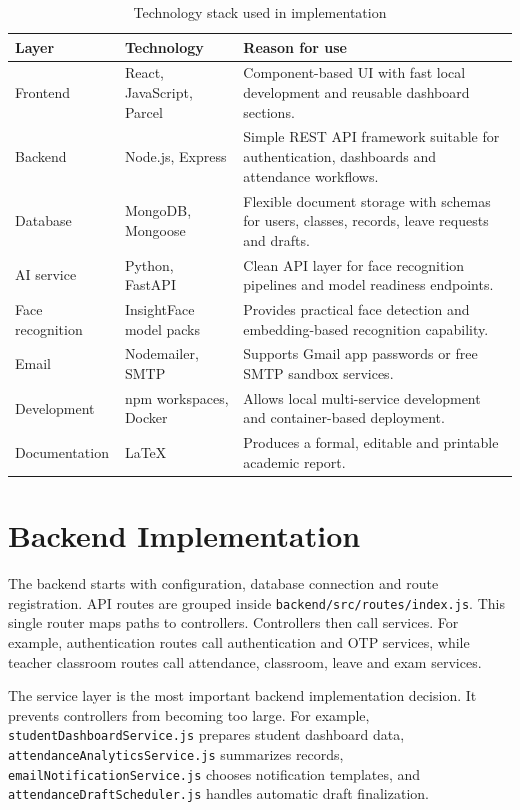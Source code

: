 \begin{table}[H]
\centering
\caption{Technology stack used in implementation}
\label{tab:tech-stack-implementation}
\begin{tabularx}{\textwidth}{p{3.2cm} p{4cm} X}
\toprule
\textbf{Layer} & \textbf{Technology} & \textbf{Reason for use}\\
\midrule
Frontend & React, JavaScript, Parcel & Component-based UI with fast local development and reusable dashboard sections.\\
Backend & Node.js, Express & Simple REST API framework suitable for authentication, dashboards and attendance workflows.\\
Database & MongoDB, Mongoose & Flexible document storage with schemas for users, classes, records, leave requests and drafts.\\
AI service & Python, FastAPI & Clean API layer for face recognition pipelines and model readiness endpoints.\\
Face recognition & InsightFace model packs & Provides practical face detection and embedding-based recognition capability.\\
Email & Nodemailer, SMTP & Supports Gmail app passwords or free SMTP sandbox services.\\
Development & npm workspaces, Docker & Allows local multi-service development and container-based deployment.\\
Documentation & LaTeX & Produces a formal, editable and printable academic report.\\
\bottomrule
\end{tabularx}
\end{table}

\section{Backend Implementation}

The backend starts with configuration, database connection and route registration. API routes are grouped inside \texttt{backend/src/routes/index.js}. This single router maps paths to controllers. Controllers then call services. For example, authentication routes call authentication and OTP services, while teacher classroom routes call attendance, classroom, leave and exam services.

The service layer is the most important backend implementation decision. It prevents controllers from becoming too large. For example, \texttt{studentDashboardService.js} prepares student dashboard data, \texttt{attendanceAnalyticsService.js} summarizes records, \texttt{emailNotificationService.js} chooses notification templates, and \texttt{attendanceDraftScheduler.js} handles automatic draft finalization.

